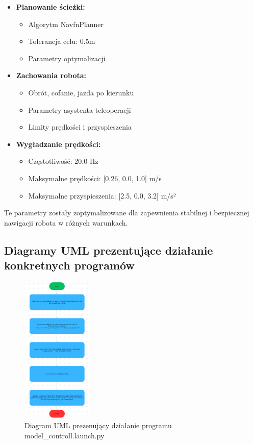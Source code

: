 \documentclass[a4paper,twoside,12pt]{book}
\begin{document}
\begin{itemize}
\begin{itemize}
	\item \textbf{Planowanie ścieżki:}
		\begin{itemize}
		\item Algorytm NavfnPlanner
		\item Tolerancja celu: 0.5m
		\item Parametry optymalizacji
		\end{itemize}

	\item \textbf{Zachowania robota:}
		\begin{itemize}
		\item Obrót, cofanie, jazda po kierunku
		\item Parametry asystenta teleoperacji
		\item Limity prędkości i przyspieszenia
		\end{itemize}

	\item \textbf{Wygładzanie prędkości:}
		\begin{itemize}
		\item Częstotliwość: 20.0 Hz
		\item Maksymalne prędkości: [0.26, 0.0, 1.0] m/s
		\item Maksymalne przyspieszenia: [2.5, 0.0, 3.2] m/s²
		\end{itemize}
	\end{itemize}

	Te parametry zostały zoptymalizowane dla zapewnienia stabilnej i bezpiecznej nawigacji robota w różnych warunkach.

\end{itemize}

\newpage
\subsection{Diagramy UML prezentujące działanie konkretnych programów}
\begin{figure}[!hb]
	\centering
	\includegraphics[width=0.3\textwidth]{images/uml-model.png}
	\caption{Diagram UML prezenujący działanie programu model\_controll.launch.py}
	\label{fig:diagram-model}
\end{figure}
\end{document}
